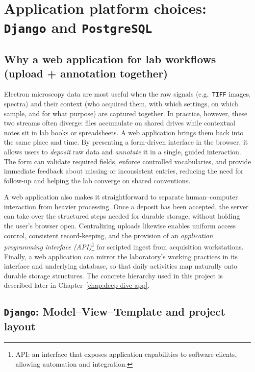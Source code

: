 \chapter{Application platform choices: \texttt{Django} and \texttt{PostgreSQL}}\label{chap:django}

\section{Why a web application for lab workflows (upload + annotation together)}
Electron microscopy data are most useful when the raw signals (e.g.\ \texttt{TIFF} images, spectra) and their context (who acquired them, with which settings, on which sample, and for what purpose) are captured together. In practice, however, these two streams often diverge: files accumulate on shared drives while contextual notes sit in lab books or spreadsheets. A web application brings them back into the same place and time. By presenting a form-driven interface in the browser, it allows users to \emph{deposit} raw data and \emph{annotate} it in a single, guided interaction. The form can validate required fields, enforce controlled vocabularies, and provide immediate feedback about missing or inconsistent entries, reducing the need for follow-up and helping the lab converge on shared conventions.

\medskip
\noindent A web application also makes it straightforward to separate human–computer interaction from heavier processing. Once a deposit has been accepted, the server can take over the structured steps needed for durable storage, without holding the user’s browser open. Centralizing uploads likewise enables uniform access control, consistent record-keeping, and the provision of an \emph{application programming interface (API)}\footnote{API: an interface that exposes application capabilities to software clients, allowing automation and integration.} for scripted ingest from acquisition workstations. Finally, a web application can mirror the laboratory’s working practices in its interface and underlying database, so that daily activities map naturally onto durable storage structures. The concrete hierarchy used in this project is described later in Chapter~\ref{chap:deep-dive-app}.

\section{\texttt{Django}: Model–View–Template and project layout}

